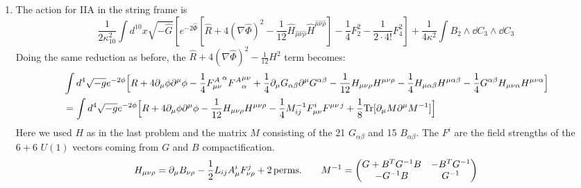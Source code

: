 \documentclass[11pt, class=article, crop=false]{standalone}
\begin{document}
\begin{enumerate}
	\item The action for IIA in the string frame is
	\[
		\frac{1}{2 \kappa_{10}^2} \int d^{10} x \sqrt{-\hat G} \left[e^{-2\hat \Phi} [\hat R + 4 (\nabla \hat \Phi)^2  - \frac{1}{12} \hat H_{\hat \mu \hat \nu \hat \rho} \hat H^{\hat \mu \hat \nu \hat \rho}] - \frac{1}{4} F_2^2 - \frac{1}{2 \cdot 4!} F_4^2 \right] + \frac{1}{4 \kappa^2} \int B_2 \wedge \dd C_3 \wedge \dd C_3
	\]
	Doing the same reduction as before, the $\hat R + 4 (\nabla \hat \Phi)^2 - \frac{1}{12} H^2$ term becomes:
	\[
	\begin{aligned}
		& \int d^4 \sqrt{-g} e^{-2\phi} \Big[R + 4 \partial_\mu \phi \partial^\mu \phi  - \frac14  {F^{A}_{\mu \nu}}^{\alpha} {F^A}^{\mu \nu}_\alpha  + \frac14 \partial_\mu G_{\alpha \beta} \partial^\mu G^{\alpha \beta}  -\frac{1}{12} H_{\mu \nu \rho} H^{\mu \nu \rho}   - \frac{1}{4} H_{\mu \alpha \beta} H^{\mu \alpha \beta} - \frac{1}{4} G^{\alpha \beta} H_{\mu \nu \alpha} H^{\mu \nu \alpha} \Big]\\
		&= \int d^4 \sqrt{-g} e^{-2\phi} \Big[R + 4 \partial_\mu \phi \partial^\mu \phi  -\frac{1}{12} H_{\mu \nu \rho} H^{\mu \nu \rho}  - \frac14 M_{ij}^{-1} F_{\mu \nu}^{i} F^{\mu \nu\, j} + \frac18 \mathrm{Tr}[\partial_\mu M \partial^\mu M^{-1}]\Big]
	\end{aligned}
	\] 
	Here we used $H$ as in the last problem and the matrix $M$ consisting of the 21 $G_{\alpha \beta}$ and 15 $B_{\alpha \beta}$. The $F^i$ are the field strengths of the $6+6$ $U(1)$ vectors coming from $G$ and $B$ compactification.
	\[
		H_{\mu \nu \rho} = \partial_\mu B_{\nu \rho} - \frac12 L_{ij} A^i_\mu  F^j_{\nu \rho} + 2 \,\mathrm{perms.}
		 \qquad M^{-1} = \begin{pmatrix}
			G + B^T G^{-1} B & - B^T G^{-1}\\
			- G^{-1} B & G^{-1}
		\end{pmatrix}
	\]
	

\end{enumerate}
\end{document}
